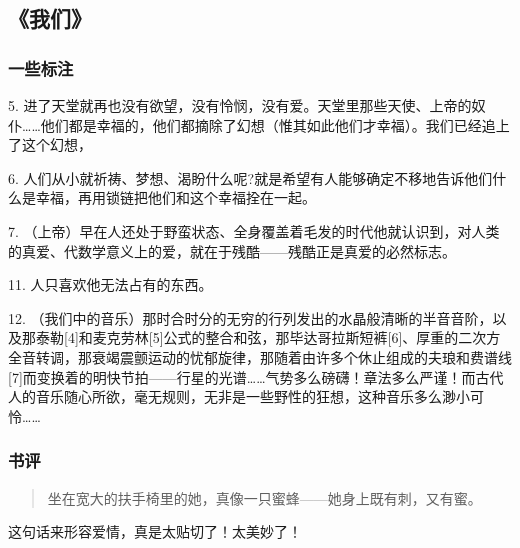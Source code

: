 \subsection{《我们》}
\subsubsection{一些标注}
5. 进了天堂就再也没有欲望，没有怜悯，没有爱。天堂里那些天使、上帝的奴仆……他们都是幸福的，他们都摘除了幻想（惟其如此他们才幸福）。我们已经追上了这个幻想，

6. 人们从小就祈祷、梦想、渴盼什么呢?就是希望有人能够确定不移地告诉他们什么是幸福，再用锁链把他们和这个幸福拴在一起。

7. （上帝）早在人还处于野蛮状态、全身覆盖着毛发的时代他就认识到，对人类的真爱、代数学意义上的爱，就在于残酷——残酷正是真爱的必然标志。 

11. 人只喜欢他无法占有的东西。

12. （我们中的音乐）那时合时分的无穷的行列发出的水晶般清晰的半音音阶，以及那泰勒[4]和麦克劳林[5]公式的整合和弦，那毕达哥拉斯短裤[6]、厚重的二次方全音转调，那衰竭震颤运动的忧郁旋律，那随着由许多个休止组成的夫琅和费谱线[7]而变换着的明快节拍——行星的光谱……气势多么磅礴！章法多么严谨！而古代人的音乐随心所欲，毫无规则，无非是一些野性的狂想，这种音乐多么渺小可怜……

\subsubsection{书评}
\begin{quotation}
坐在宽大的扶手椅里的她，真像一只蜜蜂——她身上既有刺，又有蜜。
\end{quotation}

这句话来形容爱情，真是太贴切了！太美妙了！